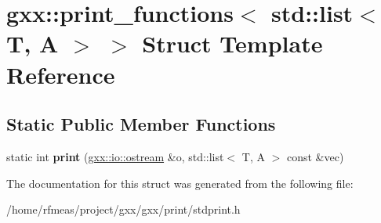 \hypertarget{structgxx_1_1print__functions_3_01std_1_1list_3_01T_00_01A_01_4_01_4}{}\section{gxx\+:\+:print\+\_\+functions$<$ std\+:\+:list$<$ T, A $>$ $>$ Struct Template Reference}
\label{structgxx_1_1print__functions_3_01std_1_1list_3_01T_00_01A_01_4_01_4}
\subsection*{Static Public Member Functions}
\begin{DoxyCompactItemize}
\item 
static int {\bfseries print} (\hyperlink{classgxx_1_1io_1_1ostream}{gxx\+::io\+::ostream} \&o, std\+::list$<$ T, A $>$ const \&vec)\hypertarget{structgxx_1_1print__functions_3_01std_1_1list_3_01T_00_01A_01_4_01_4_a8436cf8eb77769fa5a1ba47b128b767e}{}\label{structgxx_1_1print__functions_3_01std_1_1list_3_01T_00_01A_01_4_01_4_a8436cf8eb77769fa5a1ba47b128b767e}

\end{DoxyCompactItemize}


The documentation for this struct was generated from the following file\+:\begin{DoxyCompactItemize}
\item 
/home/rfmeas/project/gxx/gxx/print/stdprint.\+h\end{DoxyCompactItemize}
